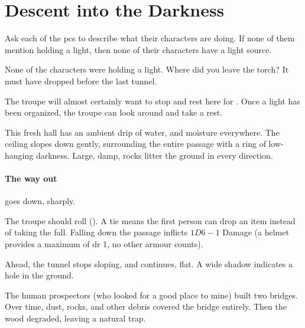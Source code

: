 \section{Descent into the Darkness}

\newcommand\fireFuel{%
  \ifnum\value{temperature}=0%
    dry leaves%
  \else%
    sticks%
  \fi%
}

\begin{multicols}{2}


Ask each of the \glspl{pc} to describe what their characters are doing.
If none of them mention holding a light, then none of their characters have a light source.

\begin{boxtext}
  None of the characters were holding a light.
  Where did you leave the torch?
  It must have dropped before the last tunnel.
\end{boxtext}

\noindent
The troupe will almost certainly want to stop and rest here for .
Once a light has been organized, the troupe can look around and take a rest.

\begin{boxtext}
  This fresh hall has an ambient drip of water, and moisture everywhere.
  The ceiling slopes down gently, surrounding the entire passage with a ring of low-hanging darkness.
  Large, damp, rocks litter the ground in every direction.
\end{boxtext}

\paragraph{The way out}
goes down, sharply.

The troupe should roll  (\tn[10]).
A tie means the first person can drop an item instead of taking the fall.
Falling down the passage inflicts $1D6-1$ Damage (a helmet provides a maximum of \gls{dr} 1, no other armour counts).

\begin{boxtext}
  Ahead, the tunnel stops sloping, and continues, flat.
  A wide shadow indicates a hole in the ground.
\end{boxtext}


\begin{exampletext}
  The human prospectors (who looked for a good place to mine) built two bridges.
  Over time, dust, rocks, and other debris covered the bridge entirely.
  Then the wood degraded, leaving a natural trap.


\end{exampletext}
\end{multicols}
